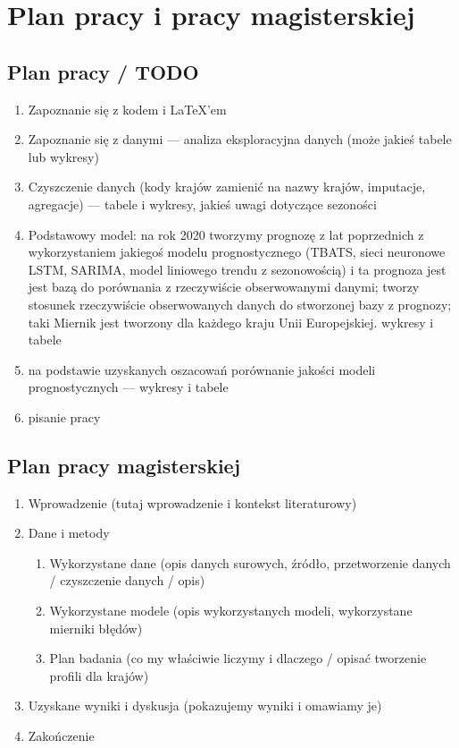 \documentclass[polish, twoside, 12pt, a4paper]{article}
\theoremstyle{definition}
\theoremstyle{plain}
\theoremstyle{remark}
\begin{document}
\section{Plan pracy i pracy magisterskiej}

\subsection{Plan pracy / TODO}

\begin{enumerate}[noitemsep]
\item Zapoznanie się z kodem i \LaTeX'em
\item Zapoznanie się z danymi --- analiza eksploracyjna danych (może jakieś tabele lub wykresy)
\item Czyszczenie danych (kody krajów zamienić na nazwy krajów, imputacje, agregacje) --- tabele i wykresy, jakieś uwagi dotyczące sezoności
\item Podstawowy model: na rok 2020 tworzymy prognozę z lat poprzednich z wykorzystaniem jakiegoś modelu prognostycznego (TBATS, sieci neuronowe LSTM, SARIMA, model liniowego trendu z sezonowością) i ta prognoza jest jest bazą do porównania z rzeczywiście obserwowanymi danymi; tworzy stosunek rzeczywiście obserwowanych danych do stworzonej bazy z prognozy; taki Miernik jest tworzony dla każdego kraju Unii Europejskiej. wykresy i tabele
\item na podstawie uzyskanych oszacowań porównanie jakości modeli prognostycznych --- wykresy i tabele
\item pisanie pracy
\end{enumerate}

\subsection{Plan pracy magisterskiej}

\begin{enumerate}[noitemsep]
\item Wprowadzenie (tutaj wprowadzenie i kontekst literaturowy)
\item Dane i metody
\begin{enumerate}[noitemsep]
\item Wykorzystane dane (opis danych surowych, źródło, przetworzenie danych / czyszczenie danych / opis)
\item Wykorzystane modele (opis wykorzystanych modeli, wykorzystane mierniki błędów)
\item Plan badania (co my właściwie liczymy i dlaczego / opisać tworzenie profili dla krajów)
\end{enumerate}
\item Uzyskane wyniki i dyskusja (pokazujemy wyniki i omawiamy je)
\item Zakończenie
\end{enumerate}
\end{document}
